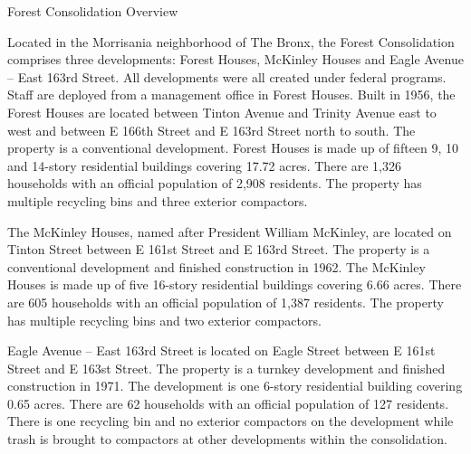 Forest Consolidation Overview

Located in the Morrisania neighborhood of The Bronx, the Forest Consolidation comprises three developments: Forest Houses, McKinley Houses and Eagle Avenue -- East 163rd Street. All developments were all created under federal programs. Staff are deployed from a management office in Forest Houses. Built in 1956, the Forest Houses are located between Tinton Avenue and Trinity Avenue east to west and between E 166th Street and E 163rd Street north to south. The property is a conventional development. Forest Houses is made up of fifteen 9, 10 and 14-story residential buildings covering 17.72 acres. There are 1,326 households with an official population of 2,908 residents. The property has multiple recycling bins and three exterior compactors.

The McKinley Houses, named after President William McKinley, are located on Tinton Street between E 161st Street and E 163rd Street. The property is a conventional development and finished construction in 1962. The McKinley Houses is made up of five 16-story residential buildings covering 6.66 acres. There are 605 households with an official population of 1,387 residents. The property has multiple recycling bins and two exterior compactors. 

Eagle Avenue -- East 163rd Street is located on Eagle Street between E 161st Street and E 163st Street. The property is a turnkey development and finished construction in 1971. The development is one 6-story residential building covering 0.65 acres. There are 62 households with an official population of 127 residents. There is one recycling bin and no exterior compactors on the development while trash is brought to compactors at other developments within the consolidation. 